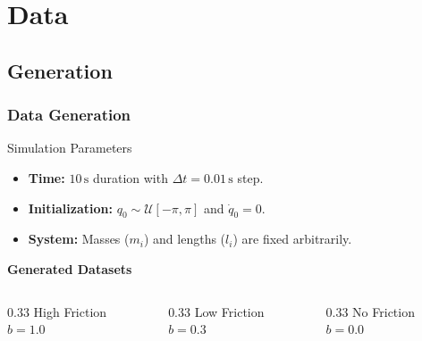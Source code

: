 \section{Data}


\subsection{Generation}

\begin{frame}
    \frametitle{Data Generation}

    \begin{block}{Simulation Parameters}
        \begin{itemize}
            \item \textbf{Time:} $10\,\text{s}$ duration with $\Delta t = 0.01\,\text{s}$ step.
            \item \textbf{Initialization:} $q_0 \sim \mathcal{U}[-\pi, \pi]$ and $\dot{q}_0 = 0$.
            \item \textbf{System:} Masses ($m_i$) and lengths ($l_i$) are fixed arbitrarily.
        \end{itemize}
    \end{block}

    \vspace{1em}

    \textbf{Generated Datasets}
    \vspace{0.5em}

    \begin{columns}[T]
        \begin{column}{0.33\textwidth}
            \centering
            \color{blue} High Friction \\
            \vspace{0.2em}
            $b = 1.0$
        \end{column}
        
        \begin{column}{0.33\textwidth}
            \centering
            \color{orange} Low Friction \\
            \vspace{0.2em}
            $b = 0.3$
        \end{column}
        
        \begin{column}{0.33\textwidth}
            \centering
            \color{red} No Friction \\
            \vspace{0.2em}
            $b = 0.0$
        \end{column}
    \end{columns}

\end{frame}

